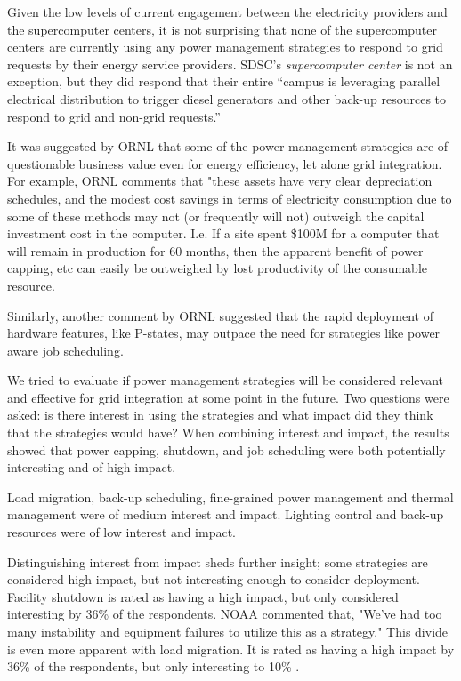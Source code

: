 Given the low levels of current engagement between the electricity
providers and the supercomputer centers, it is not surprising that none of
the supercomputer centers are currently using any power management
strategies to respond to grid requests by their energy service
providers. SDSC's \textit{supercomputer center} is not an exception, but they did respond that their
entire ``campus is leveraging parallel electrical distribution to trigger
diesel generators and other back-up resources to respond to grid and
non-grid requests.''

It was suggested by ORNL that some of the power management strategies 
are of questionable business value even for energy efficiency, let alone grid integration.
For example, ORNL comments that "these assets have very clear depreciation schedules, and the modest cost 
savings in terms of electricity consumption due to some of these methods may not (or frequently will not) 
outweigh the capital investment cost in the computer.  I.e. If a site spent \$100M for a computer that will 
remain in production for 60 months, then the 
apparent benefit of power capping, etc can easily be outweighed by lost productivity of the consumable resource.

Similarly, another comment by ORNL suggested that the rapid deployment of hardware features, like P-states,  
 may outpace the need for strategies like power aware job scheduling.

We tried to evaluate if power management strategies will be considered
relevant and effective for grid integration at some point in the future. Two
questions were asked: is there interest in using the strategies and what
impact did they think that the strategies would have? When combining
interest and impact, the results showed that power capping, shutdown, and
job scheduling were both potentially interesting and of high impact. 


Load migration, back-up
scheduling, fine-grained power management and thermal management were of medium
interest and impact. Lighting control and back-up resources were of low
interest and impact.  


Distinguishing interest from impact sheds further insight; some strategies are 
considered high impact, but not interesting enough to consider deployment.  Facility
shutdown is rated as having a high impact, but only
considered interesting by 36\% of the respondents.  NOAA commented that, 
"We've had too many instability and equipment failures to utilize this as a strategy."  This divide is even more
apparent with load migration.  It is rated as having a high impact by 36\% of the
respondents, but only interesting to 10\% .  


